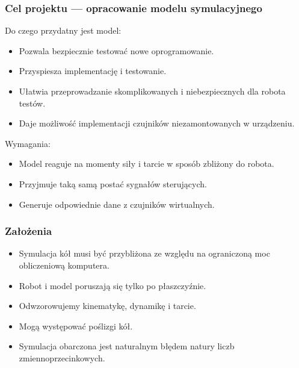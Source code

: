 \documentclass{beamer}
\begin{document}
	\begin{frame}
		\frametitle{Cel projektu --- opracowanie modelu symulacyjnego}
		Do czego przydatny jest model:
		\begin{itemize}
			\item Pozwala bezpiecznie testować nowe oprogramowanie.
			\item Przyspiesza implementację i testowanie.
			\item Ułatwia przeprowadzanie skomplikowanych i niebezpiecznych dla robota testów.
			\item Daje możliwość implementacji czujników niezamontowanych w urządzeniu.
		\end{itemize}
		Wymagania:
		\begin{itemize}
			\item Model reaguje na momenty siły i tarcie w sposób zbliżony do robota.
			\item Przyjmuje taką samą postać sygnałów sterujących.
			\item Generuje odpowiednie dane z czujników wirtualnych.
		\end{itemize}
	\end{frame}
	\begin{frame}
		\frametitle{Założenia}
		\begin{itemize}
			\item Symulacja kół musi być przybliżona ze względu na ograniczoną moc obliczeniową komputera.
			\item Robot i model poruszają się tylko po płaszczyźnie.
			\item Odwzorowujemy kinematykę, dynamikę i tarcie.
			\item Mogą występować poślizgi kół.
			\item Symulacja obarczona jest naturalnym błędem natury liczb zmiennoprzecinkowych.
		\end{itemize}
	\end{frame}
\end{document}
